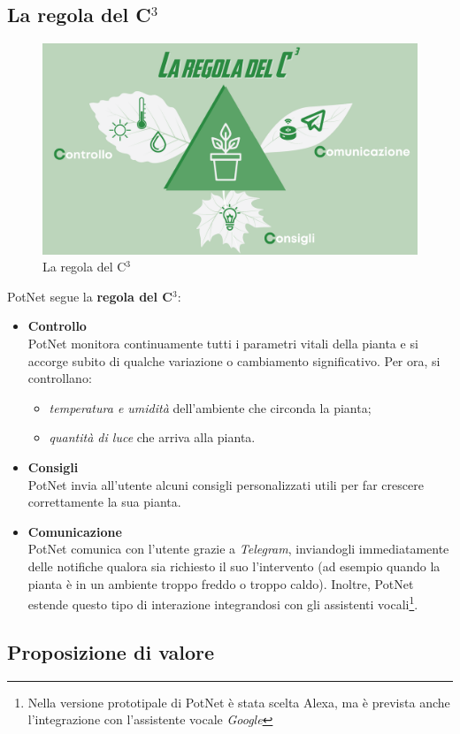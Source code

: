 \subsection{La regola del C$^3$}

\begin{figure}[h]
	\centering
	\includegraphics[width=.5\textwidth]{images/c3_rule.png}
	\caption{La regola del C$^3$}
	\label{fig:c3rule}
\end{figure}

PotNet segue la \textbf{regola del C$^3$}:
\begin{itemize}
	\item \textbf{Controllo}\\
	PotNet monitora continuamente tutti i parametri vitali della pianta e si accorge subito di qualche variazione o cambiamento significativo. Per ora, si controllano:
	\begin{itemize}
		\item \textit{temperatura e umidità} dell'ambiente che circonda la pianta;
		\item \textit{quantità di luce} che arriva alla pianta.
	\end{itemize}
	
	\item \textbf{Consigli}\\
	PotNet invia all'utente alcuni consigli personalizzati utili per far crescere correttamente la sua pianta.
	
	\item \textbf{Comunicazione}\\
	PotNet comunica con l'utente grazie a \textit{Telegram}, inviandogli immediatamente delle notifiche qualora sia richiesto il suo l'intervento (ad esempio quando la pianta è in un ambiente troppo freddo o troppo caldo). Inoltre, PotNet estende questo tipo di interazione integrandosi con gli assistenti vocali\footnote{Nella versione prototipale di PotNet è stata scelta Alexa, ma è prevista anche l'integrazione con l'assistente vocale \textit{Google}}.
\end{itemize}

\subsection{Proposizione di valore}

